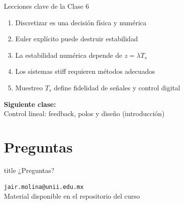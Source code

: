 \documentclass[aspectratio=169,10pt]{beamer}
\begin{document}
\begin{frame}{Lecciones clave de la Clase 6}
\small
\begin{enumerate}
\item Discretizar es una decisión física y numérica
\item Euler explícito puede destruir estabilidad
\item La estabilidad numérica depende de $z=\lambda T_s$
\item Los sistemas stiff requieren métodos adecuados
\item Muestreo $T_s$ define fidelidad de señales y control digital
\end{enumerate}

\vspace{3mm}
\begin{center}
\Large \textcolor{aerospace_blue}{\textbf{Siguiente clase:}}\\
\large Control lineal: feedback, polos y diseño (introducción)
\end{center}
\end{frame}

\section*{Preguntas}

\begin{frame}
\vfill
\centering
\begin{beamercolorbox}[sep=8pt,center,shadow=true,rounded=true]{title}
\Huge ¿Preguntas?
\end{beamercolorbox}
\vfill

\begin{center}
\large
\texttt{jair.molina@unii.edu.mx}\\[2mm]
\small
Material disponible en el repositorio del curso
\end{center}
\end{frame}
\end{document}

